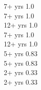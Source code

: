 
 {7+ yrs} {1.0} \\[-8pt]

 {7+ yrs} {1.0} \\[-8pt]

 {12+ yrs} {1.0} \\[-8pt]

 {7+ yrs} {1.0} \\[-8pt]

 {12+ yrs} {1.0} \\[-8pt]

 {5+ yrs} {0.83} \\[-8pt]

 {5+ yrs} {0.83} \\[-8pt]

 {2+ yrs} {0.33} \\[-8pt]

 {2+ yrs} {0.33} \\[-8pt]

